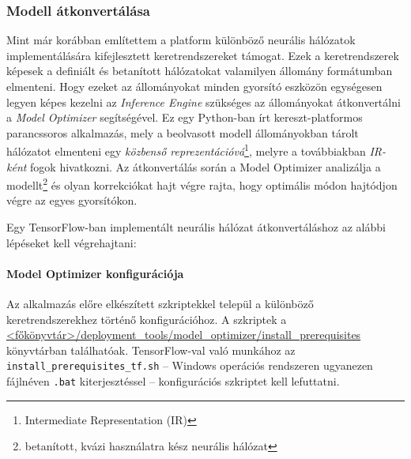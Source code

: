 \subsubsection{Modell átkonvertálása}
Mint már korábban említettem a platform különböző neurális hálózatok implementálására kifejlesztett keretrendszereket támogat. Ezek a keretrendszerek képesek a definiált és betanított hálózatokat valamilyen állomány formátumban elmenteni. Hogy ezeket az állományokat minden gyorsító eszközön egységesen legyen képes kezelni az \emph{Inference Engine} szükséges az állományokat átkonvertálni a \emph{Model Optimizer} segítségével. Ez egy Python-ban írt kereszt-platformos parancssoros alkalmazás, mely a beolvasott modell állományokban tárolt hálózatot elmenteni egy \emph{közbenső reprezentációvá}\footnote{Intermediate Representation (IR)}, melyre a továbbiakban \emph{IR-ként} fogok hivatkozni. Az átkonvertálás során a Model Optimizer analizálja a modellt\footnote{betanított, kvázi használatra kész neurális hálózat} és olyan korrekciókat hajt végre rajta, hogy optimális módon hajtódjon végre az egyes gyorsítókon. 

Egy TensorFlow-ban implementált neurális hálózat átkonvertáláshoz az alábbi lépéseket kell végrehajtani:
\paragraph*{Model Optimizer konfigurációja}
	Az alkalmazás előre elkészített szkriptekkel települ a különböző keretrendszerekhez történő konfigurációhoz. A szkriptek a \url{<főkönyvtár>/deployment_tools/model_optimizer/install_prerequisites} könyvtárban találhatóak. TensorFlow-val való munkához az \verb|install_prerequisites_tf.sh| -- Windows operációs rendszeren ugyanezen fájlnéven \verb|.bat| kiterjesztéssel -- konfigurációs szkriptet kell lefuttatni.

